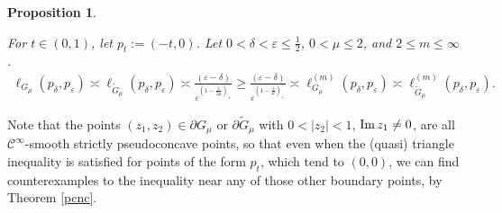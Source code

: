\documentclass[a4paper,12pt]{amsart}
\newtheorem{prop}[thm]{Proposition}
\renewcommand{\Im}{\operatorname{\rm{Im}}}
\newcommand{\eps}{\varepsilon}
\begin{document}
\begin{prop}
\label{modelest}

For $t \in (0,1)$, let $p_t := (-t,0)$. Let $0< \delta < \eps \le \frac12$, $0 < \mu \le 2$, and 
 $2 \le m \le \infty$.
\begin{multline*}
\ell_{G_\mu}(p_\delta, p_\eps) \asymp \ell_{\tilde G_\mu}(p_\delta, p_\eps) \asymp \frac{(\eps-\delta)}{\eps^{(1-\frac1{2\mu})_+}} 
\ge
\frac{(\eps-\delta)}{\eps^{(1-\frac1{\mu})_+}} \asymp \ell^{(m)}_{G_\mu}(p_\delta, p_\eps) \asymp \ell^{(m)}_{\tilde G_\mu}(p_\delta, p_\eps).
\end{multline*}
\end{prop}
Note that the points $(z_1,z_2)\in \partial G_\mu$
or $\partial \tilde G_\mu$ with $0<|z_2|<1$, $\Im z_1 \neq 0$, are all
$\mathcal C^\infty$-smooth
strictly pseudoconcave points, so that even when the (quasi)
triangle inequality is satisfied for points of the form $p_t$,
which tend to $(0,0)$,
we can find counterexamples to the inequality near any
of those other boundary points, by Theorem \ref{pcnc}.
\end{document}
